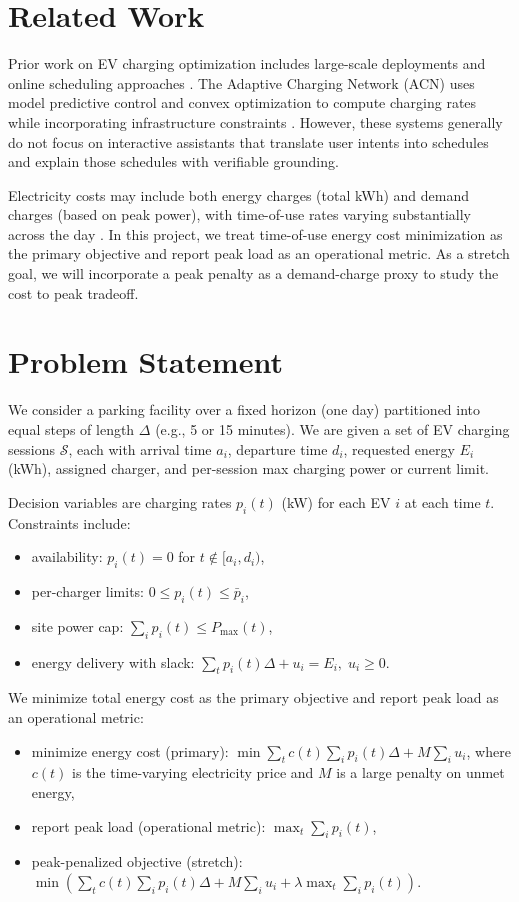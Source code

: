 \documentclass{article}
\begin{document}
\section{Related Work}
Prior work on EV charging optimization includes large-scale deployments and online scheduling approaches \cite{wang2016survey,mukherjee2015review}. The Adaptive Charging Network (ACN) uses model predictive control and convex optimization to compute charging rates while incorporating infrastructure constraints \cite{lee2020acn}. However, these systems generally do not focus on interactive assistants that translate user intents into schedules and explain those schedules with verifiable grounding.

Electricity costs may include both energy charges (total kWh) and demand charges (based on peak power), with time-of-use rates varying substantially across the day \cite{wang2016survey}. In this project, we treat time-of-use energy cost minimization as the primary objective and report peak load as an operational metric. As a stretch goal, we will incorporate a peak penalty as a demand-charge proxy to study the cost to peak tradeoff.

\section{Problem Statement}
We consider a parking facility over a fixed horizon (one day) partitioned into equal steps of length $\Delta$ (e.g., 5 or 15 minutes). We are given a set of EV charging sessions $\mathcal{S}$, each with arrival time $a_i$, departure time $d_i$, requested energy $E_i$ (kWh), assigned charger, and per-session max charging power or current limit.

Decision variables are charging rates $p_i(t)$ (kW) for each EV $i$ at each time $t$. Constraints include:
\begin{itemize}
  \item availability: $p_i(t)=0$ for $t \notin [a_i,d_i)$,
  \item per-charger limits: $0 \le p_i(t) \le \bar{p}_i$,
  \item site power cap: $\sum_{i} p_i(t) \le P_{\max}(t)$,
  \item energy delivery with slack: $\sum_t p_i(t)\Delta + u_i = E_i,\; u_i \ge 0$.
\end{itemize}

We minimize total energy cost as the primary objective and report peak load as an operational metric:
\begin{itemize}
  \item minimize energy cost (primary): $\min \sum_t c(t)\sum_i p_i(t)\Delta + M\sum_i u_i$, where $c(t)$ is the time-varying electricity price and $M$ is a large penalty on unmet energy,
  \item report peak load (operational metric): $\max_t \sum_i p_i(t)$,
  \item peak-penalized objective (stretch): $\min \left(\sum_t c(t)\sum_i p_i(t)\Delta + M\sum_i u_i + \lambda \max_t \sum_i p_i(t)\right)$.
\end{itemize}
\end{document}
